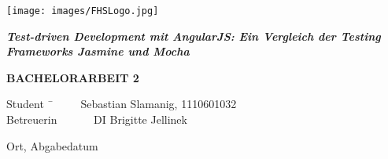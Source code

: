 \begin{titlepage}
\begin{center}

\texttt{[image: images/FHSLogo.jpg]}

\vspace*{4cm}

\Large{
  \textit{\textbf{Test-driven Development mit AngularJS: Ein Vergleich der Testing Frameworks Jasmine und Mocha}}
}

\vspace*{4cm}

\large{
  \textbf{BACHELORARBEIT 2}
}

\end{center}

\vfill

\begin{tabbing}
Student \= \ \ \ \ \ \ Sebastian Slamanig, 1110601032 \\
Betreuerin \> \ \ \ \ \ \ DI Brigitte Jellinek
\end{tabbing}

Ort, Abgabedatum

\end{titlepage}